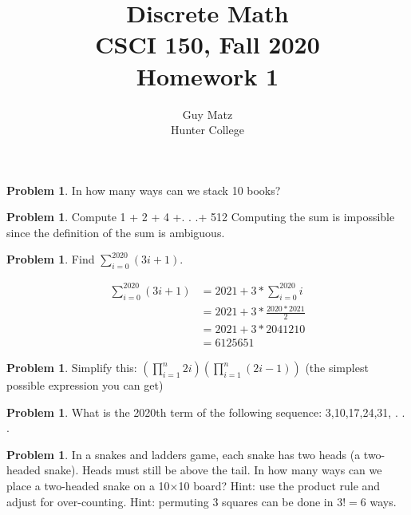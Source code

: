 \documentclass[10pt,leqno ]{article}
\title{Discrete Math\\
CSCI 150, Fall 2020\\
Homework 1}
\author{Guy Matz \\
Hunter College}
\theoremstyle{definition}
\newtheorem{problem}[theorem]{Problem}
\begin{document}



\begin{problem} In how many ways can we stack 10 books?
\end{problem}

\newpage
\begin{problem} Compute 1 + 2 + 4 +. . .+ 512
Computing the sum is impossible since the definition of the sum is ambiguous.
\end{problem}
\newpage

\begin{problem} Find $\sum_{i=0}^{2020}(3i+ 1)$.

\begin{align*}
\sum_{i=0}^{2020}(3i+ 1) &= 2021 + 3 * \sum_{i=0}^{2020}i
\\
                         &= 2021 + 3 * \frac{2020 * 2021}{2}
                         \\
                         &= 2021 + 3 * 2041210
                         \\
                         &= 6125651
\end{align*}

\end{problem}
\newpage

\begin{problem} Simplify this: $\left(\prod_{i=1}^{n}2i\right)\left(\prod_{i=1}^{n}(2i-1)\right)$ (the simplest possible expression you can get)

\end{problem}
\newpage

\begin{problem} What is the 2020th term of the following sequence: 3,10,17,24,31, . . .

\end{problem}
\newpage

\begin{problem} In a snakes and ladders game,  each snake has two heads (a two-headed snake).   Heads  must  still  be  above  the  tail.   In  how  many  ways  can  we place a two-headed snake on a 10×10 board?  Hint:  use the product rule and adjust for over-counting.  Hint:  permuting 3 squares can be done in $3! = 6$ ways.

\end{problem}
\newpage
\end{document}
